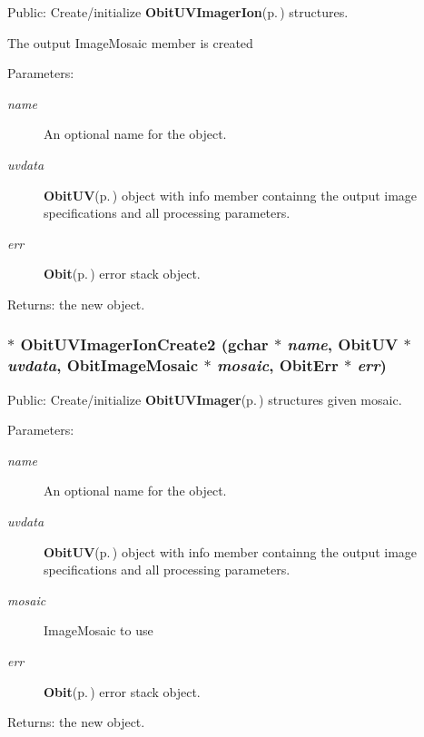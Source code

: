 Public: Create/initialize {\bf Obit\-UVImager\-Ion}{\rm (p.\,\pageref{structObitUVImagerIon})} structures. 

The output Image\-Mosaic member is created \begin{Desc}
\item[Parameters:]
\begin{description}
\item[{\em name}]An optional name for the object. \item[{\em uvdata}]{\bf Obit\-UV}{\rm (p.\,\pageref{structObitUV})} object with info member containng the output image specifications and all processing parameters. \item[{\em err}]{\bf Obit}{\rm (p.\,\pageref{structObit})} error stack object. \end{description}
\end{Desc}
\begin{Desc}
\item[Returns:]the new object. \end{Desc}
\subsubsection{$\ast$ Obit\-UVImager\-Ion\-Create2 (gchar $\ast$ {\em name}, {\bf Obit\-UV} $\ast$ {\em uvdata}, {\bf Obit\-Image\-Mosaic} $\ast$ {\em mosaic}, {\bf Obit\-Err} $\ast$ {\em err})}\label{ObitUVImagerIon_8c_a12}


Public: Create/initialize {\bf Obit\-UVImager}{\rm (p.\,\pageref{structObitUVImager})} structures given mosaic. 

\begin{Desc}
\item[Parameters:]
\begin{description}
\item[{\em name}]An optional name for the object. \item[{\em uvdata}]{\bf Obit\-UV}{\rm (p.\,\pageref{structObitUV})} object with info member containng the output image specifications and all processing parameters. \item[{\em mosaic}]Image\-Mosaic to use \item[{\em err}]{\bf Obit}{\rm (p.\,\pageref{structObit})} error stack object. \end{description}
\end{Desc}
\begin{Desc}
\item[Returns:]the new object. \end{Desc}
